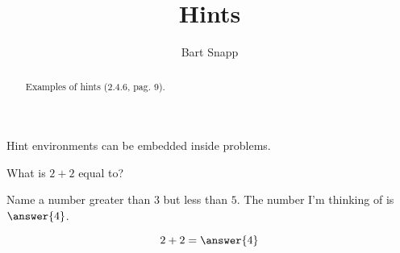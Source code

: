 \documentclass{ximera}
\title[Examples:]{Hints}
\author{Bart Snapp}
\begin{document}
\begin{abstract}
  Examples of hints (2.4.6, pag. 9).
\end{abstract}
\maketitle

Hint environments can be embedded inside problems.

\begin{problem}
  What is $2+2$ equal to?
  \begin{hint}
    Name a number greater than $3$ but less than $5$. The number I'm
    thinking of is $\answer{4}$.
  \end{hint}
  \[
  2+2 = \answer{4}
  \]
\end{problem}
\end{document}

